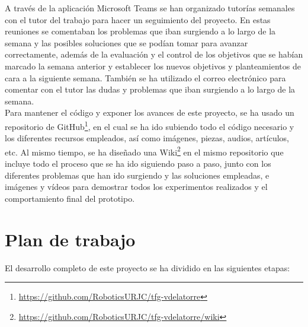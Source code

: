 A través de la aplicación Microsoft Teams se han organizado tutorías semanales con el tutor del trabajo para hacer un seguimiento del proyecto. En estas reuniones se comentaban los problemas que iban surgiendo a lo largo de la semana y las posibles soluciones que se podían tomar para avanzar correctamente, además de la evaluación y el control de los objetivos que se habían marcado la semana anterior y establecer los nuevos objetivos y planteamientos de cara a la siguiente semana. También se ha utilizado el correo electrónico para comentar con el tutor las dudas y problemas que iban surgiendo a lo largo de la semana.\\ 

Para mantener el código y exponer los avances de este proyecto, se ha usado un repositorio de GitHub\footnote{\url{https://github.com/RoboticsURJC/tfg-vdelatorre}}, en el cual se ha ido subiendo todo el código necesario y los diferentes recursos empleados, así como imágenes, piezas, audios, artículos, etc. Al mismo tiempo, se ha diseñado una Wiki\footnote{\url{https://github.com/RoboticsURJC/tfg-vdelatorre/wiki}} en el mismo repositorio que incluye todo el proceso que se ha ido siguiendo paso a paso, junto con los diferentes problemas que han ido surgiendo y las soluciones empleadas, e imágenes y vídeos para demostrar todos los experimentos realizados y el comportamiento final del prototipo.

\section{Plan de trabajo}
\label{sec:plantrabajo}

El desarrollo completo de este proyecto se ha dividido en las siguientes etapas:

